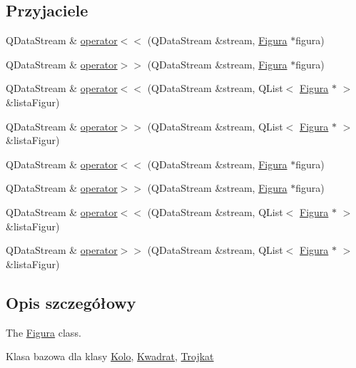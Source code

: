 \subsection*{Przyjaciele}
\begin{DoxyCompactItemize}
\item 
Q\-Data\-Stream \& \hyperlink{classFigura_ae62458d63e738dc0b2f191aff1693469}{operator$<$$<$} (Q\-Data\-Stream \&stream, \hyperlink{classFigura}{Figura} $\ast$figura)
\item 
Q\-Data\-Stream \& \hyperlink{classFigura_ab48c431f34046c3a42ab680f39a4b74d}{operator$>$$>$} (Q\-Data\-Stream \&stream, \hyperlink{classFigura}{Figura} $\ast$figura)
\item 
Q\-Data\-Stream \& \hyperlink{classFigura_aae3d696b5c2d831dd978688411e31163}{operator$<$$<$} (Q\-Data\-Stream \&stream, Q\-List$<$ \hyperlink{classFigura}{Figura} $\ast$ $>$ \&lista\-Figur)
\item 
Q\-Data\-Stream \& \hyperlink{classFigura_a1e4d4e9a4c99027be2b103f5bc9ad212}{operator$>$$>$} (Q\-Data\-Stream \&stream, Q\-List$<$ \hyperlink{classFigura}{Figura} $\ast$ $>$ \&lista\-Figur)
\item 
Q\-Data\-Stream \& \hyperlink{classFigura_ae62458d63e738dc0b2f191aff1693469}{operator$<$$<$} (Q\-Data\-Stream \&stream, \hyperlink{classFigura}{Figura} $\ast$figura)
\item 
Q\-Data\-Stream \& \hyperlink{classFigura_ab48c431f34046c3a42ab680f39a4b74d}{operator$>$$>$} (Q\-Data\-Stream \&stream, \hyperlink{classFigura}{Figura} $\ast$figura)
\item 
Q\-Data\-Stream \& \hyperlink{classFigura_aae3d696b5c2d831dd978688411e31163}{operator$<$$<$} (Q\-Data\-Stream \&stream, Q\-List$<$ \hyperlink{classFigura}{Figura} $\ast$ $>$ \&lista\-Figur)
\item 
Q\-Data\-Stream \& \hyperlink{classFigura_a1e4d4e9a4c99027be2b103f5bc9ad212}{operator$>$$>$} (Q\-Data\-Stream \&stream, Q\-List$<$ \hyperlink{classFigura}{Figura} $\ast$ $>$ \&lista\-Figur)
\end{DoxyCompactItemize}


\subsection{Opis szczegółowy}
The \hyperlink{classFigura}{Figura} class. 

Klasa bazowa dla klasy \hyperlink{classKolo}{Kolo}, \hyperlink{classKwadrat}{Kwadrat}, \hyperlink{classTrojkat}{Trojkat} 

